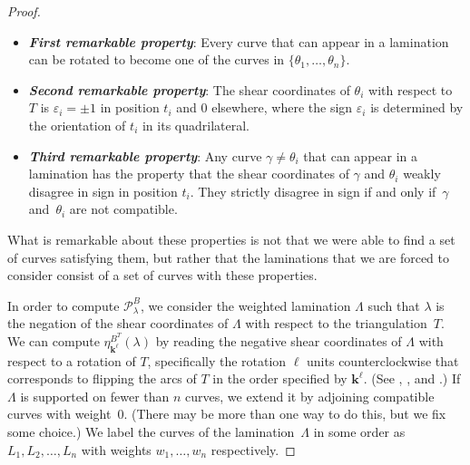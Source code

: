 \documentclass{amsart}
\theoremstyle{definition}
\theoremstyle{remark}
\numberwithin{equation}{section}
\newcommand{\newword}[1]{\textbf{\emph{#1}}}
\newcommand{\ep}{\varepsilon}
\newcommand{\set}[1]{{\lbrace #1 \rbrace}}
\newcommand{\0}{{\mathbf{0}}}
\newcommand{\kk}{{\boldsymbol{k}}}
\renewcommand{\P}{\mathcal{P}}
\begin{document}
\begin{proof}
\begin{itemize}
\item
\newword{First remarkable property}:
Every curve that can appear in a lamination can be rotated to become one of the curves in $\set{\theta_1,\ldots,\theta_n}$.
\item
\newword{Second remarkable property}:
The shear coordinates of $\theta_i$ with respect to~$T$ is $\ep_i=\pm1$ in position $t_i$ and $0$ elsewhere, where the sign $\ep_i$ is determined by the orientation of $t_i$ in its quadrilateral.
\item
\newword{Third remarkable property}:
Any curve $\gamma\neq\theta_i$ that can appear in a lamination has the property that the shear coordinates of $\gamma$ and $\theta_i$ weakly disagree in sign in position $t_i$.
They strictly disagree in sign if and only if~$\gamma$ and~$\theta_i$ are not compatible.
\end{itemize}
What is remarkable about these properties is not that we were able to find a set of curves satisfying them, but rather that the laminations that we are forced to consider consist of a set of curves with these properties.

In order to compute $\P^B_\lambda$, we consider the weighted lamination $\Lambda$ such that $\lambda$ is the negation of the shear coordinates of $\Lambda$ with respect to the triangulation~$T$.
We can compute $\eta^{B^T}_{\kk^\ell}(\lambda)$ by reading the negative shear coordinates of $\Lambda$ with respect to a rotation of $T$, specifically the rotation $\ell$ units counterclockwise that corresponds to flipping the arcs of $T$ in the order specified by $\kk^\ell$.
(See \cite[Theorem~12.6]{cats2}, \cite[Theorem~4.3]{unisurface}, and \cite[Section~5]{unisurface}.)
If $\Lambda$ is supported on fewer than $n$ curves, we extend it by adjoining compatible curves with weight~$0$.
(There may be more than one way to do this, but we fix some choice.)
We label the curves of the lamination~$\Lambda$ in some order as $L_1,L_2,\ldots,L_n$ with weights $w_1,\ldots,w_n$ respectively.


\end{proof}
\end{document}
